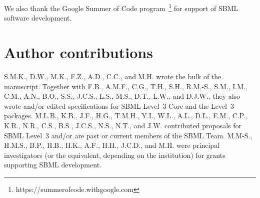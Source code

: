 \documentclass{sbml-paper}
\begin{document}
We also thank the Google Summer of Code program~\footnote{https://summerofcode.withgoogle.com} for support of SBML software development.


\section*{Author contributions}

S.M.K., D.W., M.K., F.Z., A.D., C.C., and M.H. wrote the bulk of the manuscript.  Together with F.B., A.M.F., C.G., T.H., S.H., R.M.-S., S.M., I.M., C.M., A.N., B.O., S.S., J.C.S., L.S., M.S., D.T., L.W., and D.J.W., they also wrote and/or edited specifications for SBML Level~3 Core and the Level~3 packages.  M.L.B., K.B., J.F., H.G., T.M.H., Y.I., W.L., A.L., D.L., E.M., C.P., K.R., N.R., C.S., B.S., J.C.S., N.S., N.T., and J.W. contributed proposals for SBML Level~3 and/or are past or current members of the SBML Team.  M.M-S., H.M.S., B.P., H.B., H.K., A.F., H.H., J.C.D., and M.H. were principal investigators (or the equivalent, depending on the institution) for grants supporting SBML development.



\clearpage



\end{document}
